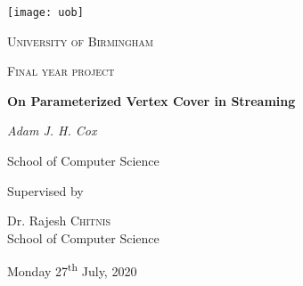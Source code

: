 \begin{titlepage}

    \thispagestyle{empty}
    \setlength\headheight{100pt}
    \begin{center}

        \center\texttt{[image: uob]}

        \vspace{0.25cm}
        {\scshape\LARGE University of Birmingham \par}
        \vspace{0.25cm}
        {\scshape\Large Final year project\par}
        \vspace{0.5cm}

        {\Large\bfseries On Parameterized Vertex Cover in Streaming\par}

        \vspace{0.5cm}
        {\Large\itshape Adam J. H. Cox\par}
        School of Computer Science
        \vspace{0.25cm}

        \vspace{1cm}
        Supervised by\par
        Dr. Rajesh \textsc{Chitnis} \\
        School of Computer Science\par
        \vspace{1.5cm}
        \large
        Monday 27\textsuperscript{th} July, 2020

    \end{center}

    \clearpage
    \restoregeometry
\end{titlepage}
